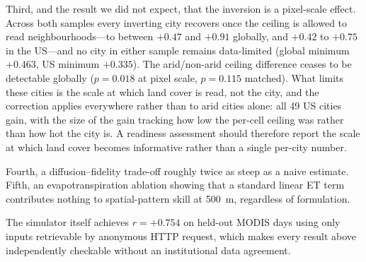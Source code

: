 \documentclass[remotesensing,article,submit,oneauthor]{Definitions/mdpi}
\begin{document}
Third, and the result we did not expect, that the inversion is a
pixel-scale effect. Across both samples every inverting city recovers
once the ceiling is allowed to read neighbourhoods---to between $+0.47$
and $+0.91$ globally, and $+0.42$ to $+0.75$ in the US---and no city in
either sample remains data-limited (global minimum $+0.463$, US minimum
$+0.335$). The arid/non-arid ceiling difference ceases to be detectable
globally ($p = 0.018$ at pixel scale, $p = 0.115$ matched). What limits
these cities is the scale at which land cover is read, not the city, and
the correction applies everywhere rather than to arid cities alone: all
49 US cities gain, with the size of the gain tracking how low the
per-cell ceiling was rather than how hot the city is. A readiness
assessment should therefore report the scale at which land cover becomes
informative rather than a single per-city number.

Fourth, a diffusion--fidelity trade-off roughly twice as steep as a naive
estimate. Fifth, an evapotranspiration ablation showing that a standard
linear ET term contributes nothing to spatial-pattern skill at 500~m,
regardless of formulation.

The simulator itself achieves $r = +0.754$ on held-out MODIS days using
only inputs retrievable by anonymous HTTP request, which makes every
result above independently checkable without an institutional data
agreement.

\vspace{6pt}





\end{document}
